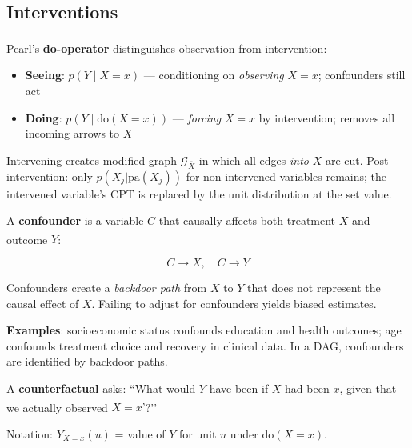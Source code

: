     \subsection{Interventions}
    \begin{tcbitemize}[ skin=sectionraster ]

    \tcbitem[title={Seeing vs Doing: The Do-Operator}, raster multicolumn=3]
    Pearl’s \textbf{do-operator} distinguishes observation from
    intervention:\textsuperscript{\cite[][pp.~50--51]{barberBayesianReasoningMachine2012}}

    \begin{itemize}
        \item \textbf{Seeing}: $p(Y \mid X{=}x)$ --- conditioning on
              \emph{observing} $X{=}x$; confounders still act
        \item \textbf{Doing}: $p(Y \mid \mathrm{do}(X{=}x))$ --- \emph{forcing}
              $X{=}x$ by intervention; removes all incoming arrows to $X$
    \end{itemize}

    Intervening creates modified graph $\mathcal{G}_{\overline{X}}$ in which
    all edges \emph{into} $X$ are cut. Post-intervention: only $p(X_j | \mathrm{pa}(X_j))$
    for non-intervened variables remains; the intervened variable’s CPT is replaced
    by the unit distribution at the set value.

    \tcbitem[title=Confounders, raster multicolumn=3]
    A \textbf{confounder} is a variable $C$ that causally affects both
    treatment $X$ and outcome
    $Y$:\textsuperscript{\cite[][Ch.~7]{hernanCausalInferenceWhat2020}}

    \[ C \rightarrow X,\quad C \rightarrow Y \]

    Confounders create a \emph{backdoor path} from $X$ to $Y$ that does not
    represent the causal effect of $X$. Failing to adjust for confounders
    yields biased estimates.

    \textbf{Examples}: socioeconomic status confounds education and health
    outcomes; age confounds treatment choice and recovery in clinical data.
    In a DAG, confounders are identified by backdoor paths.

    \tcbitem[title=Counterfactuals, raster multicolumn=3]
    A \textbf{counterfactual} asks: ``What would $Y$ have been if $X$ had been
    $x$, given that we actually observed $X{=}x’$?’’\textsuperscript{\cite[][Ch.~7]{pearlCausalityModelsReasoning2009}}

    Notation: $Y_{X=x}(u)$ = value of $Y$ for unit $u$ under
    $\mathrm{do}(X{=}x)$.


\end{tcbitemize}
